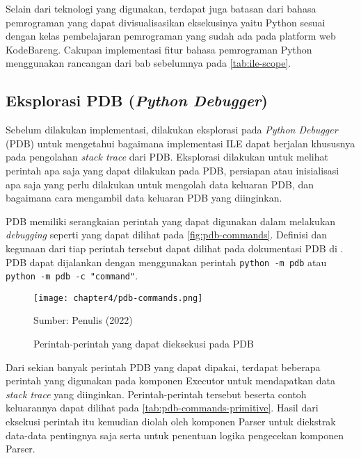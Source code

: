 Selain dari teknologi yang digunakan, terdapat juga batasan dari bahasa pemrograman yang dapat divisualisasikan eksekusinya yaitu Python sesuai dengan kelas pembelajaran pemrograman yang sudah ada pada platform web KodeBareng. Cakupan implementasi fitur bahasa pemrograman Python menggunakan rancangan dari bab sebelumnya pada \autoref{tab:ile-scope}.

\subsection{Eksplorasi PDB (\textit{Python Debugger})}

Sebelum dilakukan implementasi, dilakukan eksplorasi pada \textit{Python Debugger} (PDB) untuk mengetahui bagaimana implementasi ILE dapat berjalan khususnya pada pengolahan \textit{stack trace} dari PDB. Eksplorasi dilakukan untuk melihat perintah apa saja yang dapat dilakukan pada PDB, persiapan atau inisialisasi apa saja yang perlu dilakukan untuk mengolah data keluaran PDB, dan bagaimana cara mengambil data keluaran PDB yang diinginkan.

PDB memiliki serangkaian perintah yang dapat digunakan dalam melakukan \textit{debugging} seperti yang dapat dilihat pada \autoref{fig:pdb-commands}. Definisi dan kegunaan dari tiap perintah tersebut dapat dilihat pada dokumentasi PDB di \textcite{pdb2022documentation}. PDB dapat dijalankan dengan menggunakan perintah \verb|python -m pdb| atau \verb|python -m pdb -c "command"|.

\begin{figure}[!h]
  \centering
  \texttt{[image: chapter4/pdb-commands.png]}
  \caption{Perintah-perintah yang dapat dieksekusi pada PDB} \label{fig:pdb-commands}
  Sumber: Penulis (2022)
\end{figure}

Dari sekian banyak perintah PDB yang dapat dipakai, terdapat beberapa perintah yang digunakan pada komponen Executor untuk mendapatkan data \textit{stack trace} yang diinginkan. Perintah-perintah tersebut beserta contoh keluarannya dapat dilihat pada \autoref{tab:pdb-commands-primitive}. Hasil dari eksekusi perintah itu kemudian diolah oleh komponen Parser untuk diekstrak data-data pentingnya saja serta untuk penentuan logika pengecekan komponen Parser.

